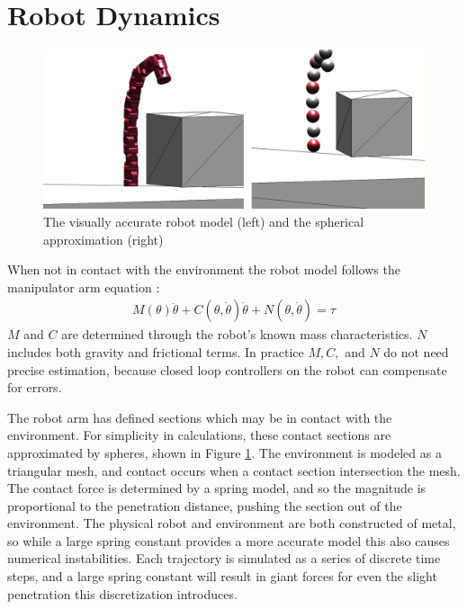 \documentclass[../thesis.tex]{subfiles}
\begin{document}
\section{Robot Dynamics} \label{sec:robot_dynamics}

\begin{figure}
  \centering
  \includegraphics[width=.7\linewidth]{./Planning/sphere_approxmation.png}
  \caption{The visually accurate robot model (left) and the spherical approximation (right)}
  \label{fig:sphere_approximation}
\end{figure}


When not in contact with the environment the robot model follows the manipulator arm equation \cite{murray1994mathematical}:
\begin{align}
  M(\theta)\ddot \theta + C(\theta, \dot\theta)\dot\theta + N(\theta, \dot\theta) = \tau
\end{align}
$M$ and $C$ are determined through the robot's known mass characteristics.
$N$ includes both gravity and frictional terms.
In practice $M, C,$ and $N$ do not need precise estimation, because closed loop controllers on the robot can compensate for errors.

The robot arm has defined sections which may be in contact with the environment.
For simplicity in calculations, these contact sections are approximated by spheres, shown in Figure \ref{fig:sphere_approximation}.
The environment is modeled as a triangular mesh, and contact occurs when a contact section intersection the mesh.
The contact force is determined by a spring model, and so the magnitude is proportional to the penetration distance, pushing the section out of the environment.
The physical robot and environment are both constructed of metal, so while a large spring constant provides a more accurate model this also causes numerical instabilities.
Each trajectory is simulated as a series of discrete time steps, and a large spring constant will result in giant forces for even the slight penetration this discretization introduces.

\end{document}
